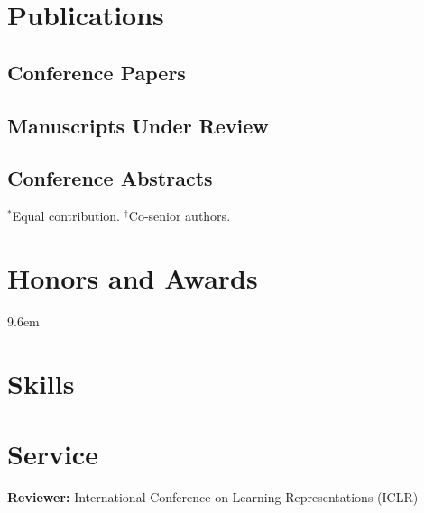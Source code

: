 \documentclass{clean_cv}
\begin{document}
\section{Publications}
\subsection{Conference Papers}\hfill\par
\begin{publist}
\pubPOCO
\pubHebbian
\end{publist}

\subsection{Manuscripts Under Review}\hfill\par
\begin{publist}[resume]
\pubSlider
\pubVerify
\end{publist}

\subsection{Conference Abstracts}\hfill\par
\begin{publist}[resume]
\pubCosyneCausal
\pubCosyneDist
\pubNMRNN
\pubWM
\end{publist}
\hfill{\small $^*$Equal contribution. $^\dagger$Co-senior authors.}


\section{Honors and Awards}
\begin{datetabular}{9.6em}\setlength{\itemsep}{0pt}
\honorslist
\end{datetabular}

\section{Skills}
\skillsline

\section{Service}
\textbf{Reviewer:} International Conference on Learning Representations (ICLR)
\end{document}
